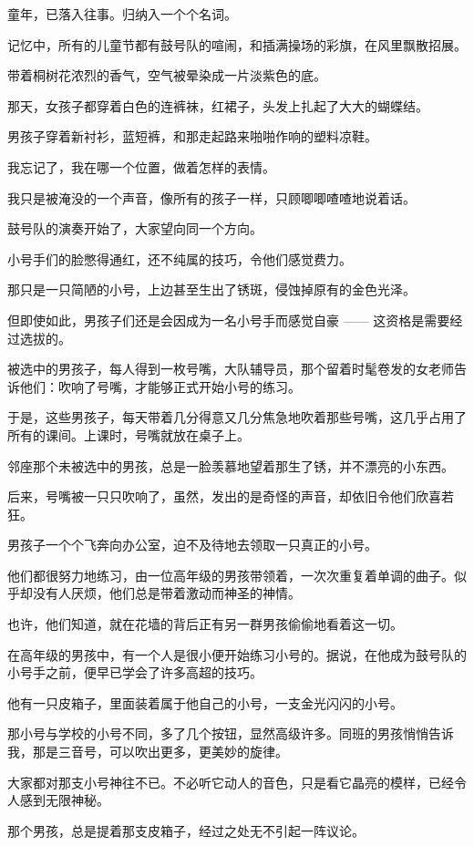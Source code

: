 		童年，已落入往事。归纳入一个个名词。


		记忆中，所有的儿童节都有鼓号队的喧闹，和插满操场的彩旗，在风里飘散招展。\par
		带着桐树花浓烈的香气，空气被晕染成一片淡紫色的底。\par
		那天，女孩子都穿着白色的连裤袜，红裙子，头发上扎起了大大的蝴蝶结。\par
		男孩子穿着新衬衫，蓝短裤，和那走起路来啪啪作响的塑料凉鞋。

		我忘记了，我在哪一个位置，做着怎样的表情。\par
		我只是被淹没的一个声音，像所有的孩子一样，只顾唧唧喳喳地说着话。

		鼓号队的演奏开始了，大家望向同一个方向。\par
		小号手们的脸憋得通红，还不纯属的技巧，令他们感觉费力。

		那只是一只简陋的小号，上边甚至生出了锈斑，侵蚀掉原有的金色光泽。\par
		但即使如此，男孩子们还是会因成为一名小号手而感觉自豪 —— 这资格是需要经过选拔的。\par
		被选中的男孩子，每人得到一枚号嘴，大队辅导员，那个留着时髦卷发的女老师告诉他们：吹响了号嘴，才能够正式开始小号的练习。\par
		于是，这些男孩子，每天带着几分得意又几分焦急地吹着那些号嘴，这几乎占用了所有的课间。上课时，号嘴就放在桌子上。\par
		邻座那个未被选中的男孩，总是一脸羡慕地望着那生了锈，并不漂亮的小东西。

		后来，号嘴被一只只吹响了，虽然，发出的是奇怪的声音，却依旧令他们欣喜若狂。\par
		男孩子一个个飞奔向办公室，迫不及待地去领取一只真正的小号。

		他们都很努力地练习，由一位高年级的男孩带领着，一次次重复着单调的曲子。似乎却没有人厌烦，他们总是带着激动而神圣的神情。\par
		也许，他们知道，就在花墙的背后正有另一群男孩偷偷地看着这一切。

		在高年级的男孩中，有一个人是很小便开始练习小号的。据说，在他成为鼓号队的小号手之前，便早已学会了许多高超的技巧。\par
		他有一只皮箱子，里面装着属于他自己的小号，一支金光闪闪的小号。\par
		那小号与学校的小号不同，多了几个按钮，显然高级许多。同班的男孩悄悄告诉我，那是三音号，可以吹出更多，更美妙的旋律。\par
		大家都对那支小号神往不已。不必听它动人的音色，只是看它晶亮的模样，已经令人感到无限神秘。\par
		那个男孩，总是提着那支皮箱子，经过之处无不引起一阵议论。

